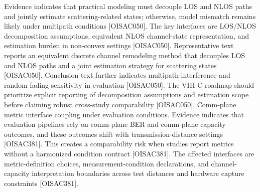  Evidence indicates that practical modeling must decouple LOS and NLOS paths and jointly estimate scattering-related states; otherwise, model mismatch remains likely under multipath conditions [O\markdownRendererUnderscore{}ISAC\markdownRendererUnderscore{}050].\markdownRendererOlItemEnd 
{} The key interfaces are LOS/NLOS decomposition assumptions, equivalent NLOS channel-state representation, and estimation burden in non-convex settings [O\markdownRendererUnderscore{}ISAC\markdownRendererUnderscore{}050].\markdownRendererOlItemEnd 
{} Representative text reports an equivalent discrete channel remodeling method that decouples LOS and NLOS paths and a joint estimation strategy for scattering states [O\markdownRendererUnderscore{}ISAC\markdownRendererUnderscore{}050]. Conclusion text further indicates multipath-interference and random-fading sensitivity in evaluation [O\markdownRendererUnderscore{}ISAC\markdownRendererUnderscore{}050].\markdownRendererOlItemEnd 
{} The VIII-C roadmap should prioritize explicit reporting of decomposition assumptions and estimation scope before claiming robust cross-study comparability [O\markdownRendererUnderscore{}ISAC\markdownRendererUnderscore{}050].\markdownRendererOlItemEnd 
\markdownRendererOlEnd \markdownRendererInterblockSeparator
{}
\markdownRendererSectionEnd \markdownRendererSectionBegin
{}\markdownRendererInterblockSeparator
{}\markdownRendererOlBegin
{} Comm-plane metric interface coupling under evaluation conditions.\markdownRendererOlItemEnd 
{} Evidence indicates that evaluation pipelines rely on comm-plane BER and comm-plane capacity outcomes, and these outcomes shift with transmission-distance settings [O\markdownRendererUnderscore{}ISAC\markdownRendererUnderscore{}381]. This creates a comparability risk when studies report metrics without a harmonized condition contract [O\markdownRendererUnderscore{}ISAC\markdownRendererUnderscore{}381].\markdownRendererOlItemEnd 
{} The affected interfaces are metric-definition choices, measurement-condition declarations, and channel-capacity interpretation boundaries across test distances and hardware capture constraints [O\markdownRendererUnderscore{}ISAC\markdownRendererUnderscore{}381].\markdownRendererOlItemEnd 
